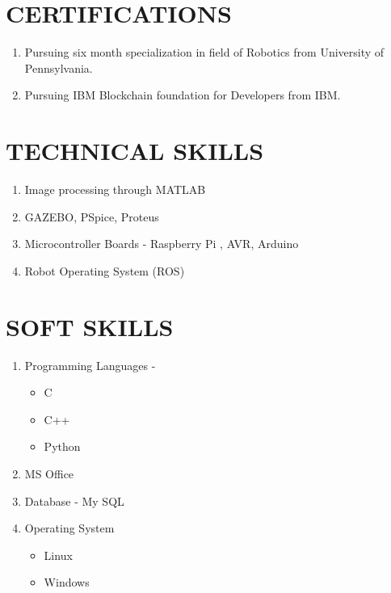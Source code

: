 \documentclass[margin,line]{res}
\begin{document}
\begin{resume}
\section{\sc CERTIFICATIONS}
\begin{enumerate}
\item Pursuing six month specialization in field of Robotics from University of Pennsylvania.
\item Pursuing IBM Blockchain foundation for Developers from IBM.
\end{enumerate}

\section{\sc TECHNICAL SKILLS}
\begin{enumerate}
\item Image processing through MATLAB
\item GAZEBO, PSpice, Proteus
\item Microcontroller Boards - Raspberry Pi , AVR, Arduino
\item Robot Operating System (ROS)
\end{enumerate}

\section{\sc SOFT SKILLS}
\begin{enumerate}
\item Programming Languages - 
 \begin{itemize}
 \item C \item C++ \item Python
 \end{itemize}
\item MS Office
\item Database {-} My SQL
\item Operating System
 \begin{itemize}
 \item Linux
 \item Windows
 \end{itemize}
\end{enumerate}


\end{resume}
\end{document}
